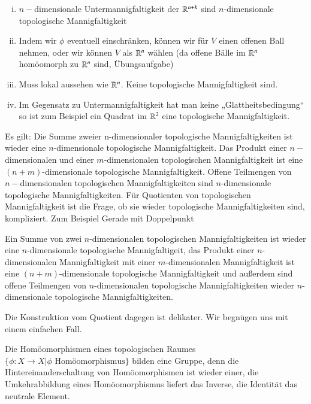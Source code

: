 \documentclass[a4paper,10pt]{scrartcl}
\begin{document}
\begin{note*}
 \begin{enumerate}[(i)]
  \item $n-$dimensionale Untermannigfaltigkeit der $\mathbb{R}^{n+k}$ sind $n$-dimensionale topologische Mannigfaltigkeit
  \item Indem wir $\phi$ eventuell einschränken, können wir für $V$ einen offenen Ball nehmen, oder wir können $V$ als $\mathbb{R}^n$ wählen (da offene Bälle im $\mathbb{R}^n$ homöomorph zu $\mathbb{R}^n$ sind, Übungsaufgabe)
  \item Muss lokal aussehen wie $\mathbb{R}^n$. Keine topologische Mannigfaltigkeit sind.
\begin{figure}[H]
\centering
 \fixme[fig32]
\caption{}
\end{figure}
\item Im Gegensatz zu Untermannigfaltigkeit hat man keine „Glattheitsbedingung“ so ist zum Beispiel ein Quadrat im $\mathbb{R}^2$ eine topologische Mannigfaltigkeit.
 \end{enumerate}
\end{note*}
Es gilt: Die Summe zweier n-dimensionaler topologische Mannigfaltigkeiten ist wieder eine $n$-dimensionale topologische Mannigfaltigkeit. Das Produkt einer $n-$dimensionalen und einer $m$-dimensionalen topologischen Mannigfaltigkeit ist eine $(n+m)$-dimensionale topologische Mannigfaltigkeit.  Offene Teilmengen von $n-$dimensionalen topologischen Mannigfaltigkeiten sind $n$-dimensionale topologische Mannigfaltigkeiten. Für Quotienten von topologischen Mannigfaltigkeit ist die Frage, ob sie wieder topologische Mannigfaltigkeiten sind, kompliziert.
Zum Beispiel Gerade mit Doppelpunkt
\begin{figure}[H]
\centering
 \fixme[fig33]
\caption{}
\end{figure}
Ein Summe von zwei $n$-dimensionalen topologischen Mannigfaltigkeiten ist wieder eine $n$-dimensionale topologische Mannigfaltigeit, das Produkt einer $n$-dimensionalen Mannigfaltigkeit mit einer $m$-dimensionalen Mannigfaltigkeit ist eine $(n+ m)$-dimensionale topologische Mannigfaltigkeit und außerdem sind offene Teilmengen von $n$-dimensionalen topologische Mannigfaltigkeiten wieder $n$-dimensionale topologische Mannigfaltigkeiten.  

Die Konstruktion vom Quotient dagegen ist delikater. Wir begnügen uns mit einem einfachen Fall.

Die Homöomorphismen eines topologischen Raumes $\{\phi: X\to X|\phi \text{ Homöomorphismus}\}$ bilden eine Gruppe, denn die Hintereinanderschaltung von Homöomorphismen ist wieder einer, die Umkehrabbildung eines Homöomorphismus liefert das Inverse, die Identität das neutrale Element.
\end{document}
